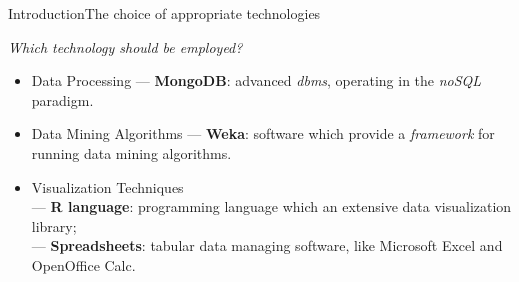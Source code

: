 \begin{frame}{Introduction}{The choice of appropriate technologies}

	\centering\textit{Which technology should be employed?} \vspace{0,3cm}

	\begin{block}{}
	    \begin{itemize}
		    \item<1-> \alert{Data Processing} --- \textbf{MongoDB}: advanced \emph{dbms}, operating in the \emph{noSQL} paradigm.
		    \item<2-> \alert{Data Mining Algorithms} --- \textbf{Weka}: software which provide a \emph{framework} for running data mining algorithms.
			\item<3-> \alert{Visualization Techniques} \\
			--- \textbf{R language}: programming language which an extensive data visualization library; \\
			--- \textbf{Spreadsheets}: tabular data managing software, like Microsoft Excel and OpenOffice Calc.
	    \end{itemize}
    \end{block}

\end{frame}

